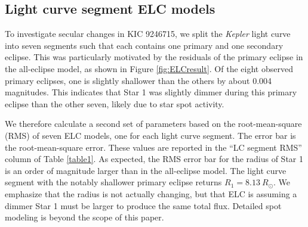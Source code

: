 \subsection{Light curve segment ELC models}
To investigate secular changes in KIC 9246715, we split the \emph{Kepler} light curve into seven segments such that each contains one primary and one secondary eclipse. This was particularly motivated by the residuals of the primary eclipse in the all-eclipse model, as shown in Figure \ref{fig:ELCresult}. Of the eight observed primary eclipses, one is slightly shallower than the others by about 0.004 magnitudes. This indicates that Star 1 was slightly dimmer during this primary eclipse than the other seven, likely due to star spot activity.

We therefore calculate a second set of parameters based on the root-mean-square (RMS) of seven ELC models, one for each light curve segment. The error bar is the root-mean-square error. These values are reported in the ``LC segment RMS'' column of Table \ref{table1}. As expected, the RMS error bar for the radius of Star 1 is an order of magnitude larger than in the all-eclipse model. The light curve segment with the notably shallower primary eclipse returns $R_1 = 8.13 \ R_{\odot}$. We emphasize that the radius is not actually changing, but that ELC is assuming a dimmer Star 1 must be larger to produce the same total flux. Detailed spot modeling is beyond the scope of this paper.